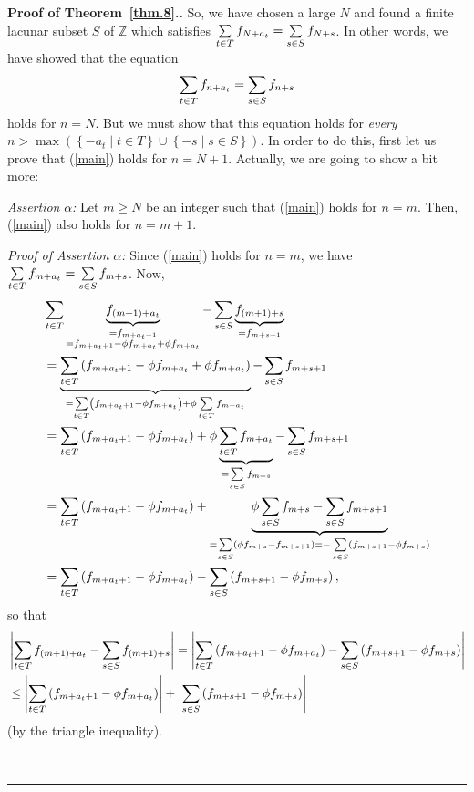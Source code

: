 \documentclass[numbers=enddot,12pt,final,onecolumn,notitlepage]{scrartcl}%
\numberwithin{exer}{section}
\theoremstyle{definition}
\newenvironment{proof}[1][Proof]{\noindent\textbf{#1.} }{\ \rule{0.5em}{0.5em}}
\let\sumnonlimits\sum
\renewcommand{\sum}{\sumnonlimits\limits}
\begin{document}
\begin{proof}[Proof of Theorem~\ref{thm.8}.]
So, we have chosen a large $N$ and found a finite lacunar subset $S$ of
$\mathbb{Z}$ which satisfies $\sum\limits_{t\in T}f_{N+a_{t}}=\sum
\limits_{s\in S}f_{N+s}$. In other words, we have showed that the equation
\begin{equation}
\sum\limits_{t\in T}f_{n+a_{t}}=\sum\limits_{s\in S}f_{n+s} \label{main}%
\end{equation}
holds for $n=N$. But we must show that this equation holds for \textit{every}
$n>\max\left(  \left\{  -a_{t}\mid t\in T\right\}  \cup\left\{  -s\mid s\in
S\right\}  \right)  $. In order to do this, first let us prove that
(\ref{main}) holds for $n=N+1$. Actually, we are going to show a bit more:

\textit{Assertion }$\alpha$\textit{:} Let $m\geq N$ be an integer such that
(\ref{main}) holds for $n=m$. Then, (\ref{main}) also holds for $n=m+1$.

\textit{Proof of Assertion }$\alpha$\textit{:} Since (\ref{main}) holds for
$n=m$, we have $\sum\limits_{t\in T}f_{m+a_{t}}=\sum\limits_{s\in S}f_{m+s}$.
Now,%
\begin{align*}
&  \sum\limits_{t\in T}\underbrace{f_{\left(  m+1\right)  +a_{t}}%
}_{\substack{=f_{m+a_{t}+1}\\=f_{m+a_{t}+1}-\phi f_{m+a_{t}}+\phi f_{m+a_{t}}%
}}-\sum\limits_{s\in S}\underbrace{f_{\left(  m+1\right)  +s}}_{=f_{m+s+1}}\\
&  =\underbrace{\sum\limits_{t\in T}\left(  f_{m+a_{t}+1}-\phi f_{m+a_{t}%
}+\phi f_{m+a_{t}}\right)  }_{=\sum\limits_{t\in T}\left(  f_{m+a_{t}+1}-\phi
f_{m+a_{t}}\right)  +\phi\sum\limits_{t\in T}f_{m+a_{t}}}-\sum\limits_{s\in
S}f_{m+s+1}\\
&  =\sum\limits_{t\in T}\left(  f_{m+a_{t}+1}-\phi f_{m+a_{t}}\right)
+\phi\underbrace{\sum\limits_{t\in T}f_{m+a_{t}}}_{=\sum\limits_{s\in
S}f_{m+s}}-\sum\limits_{s\in S}f_{m+s+1}\\
&  =\sum\limits_{t\in T}\left(  f_{m+a_{t}+1}-\phi f_{m+a_{t}}\right)
+\underbrace{\phi\sum\limits_{s\in S}f_{m+s}-\sum\limits_{s\in S}f_{m+s+1}%
}_{=\sum\limits_{s\in S}\left(  \phi f_{m+s}-f_{m+s+1}\right)  =-\sum
\limits_{s\in S}\left(  f_{m+s+1}-\phi f_{m+s}\right)  }\\
&  =\sum\limits_{t\in T}\left(  f_{m+a_{t}+1}-\phi f_{m+a_{t}}\right)
-\sum\limits_{s\in S}\left(  f_{m+s+1}-\phi f_{m+s}\right)  ,
\end{align*}
so that%
\begin{align}
&  \left\vert \sum\limits_{t\in T}f_{\left(  m+1\right)  +a_{t}}%
-\sum\limits_{s\in S}f_{\left(  m+1\right)  +s}\right\vert =\left\vert
\sum\limits_{t\in T}\left(  f_{m+a_{t}+1}-\phi f_{m+a_{t}}\right)
-\sum\limits_{s\in S}\left(  f_{m+s+1}-\phi f_{m+s}\right)  \right\vert
\nonumber\\
&  \leq\left\vert \sum\limits_{t\in T}\left(  f_{m+a_{t}+1}-\phi f_{m+a_{t}%
}\right)  \right\vert +\left\vert \sum\limits_{s\in S}\left(  f_{m+s+1}-\phi
f_{m+s}\right)  \right\vert \label{Estimate1}%
\end{align}
(by the triangle inequality).


\end{proof}
\end{document}
